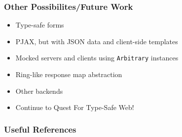 \begin{frame}
  \frametitle{Other Possibilites/Future Work}
  \begin{itemize}
    \pause
    \item<+-> Type-safe forms
    \item<+-> PJAX, but with JSON data and client-side templates
    \item<+-> Mocked servers and clients using \lstinline{Arbitrary} instances
    \item<+-> Ring-like response map abstraction
    \item<+-> Other backends
    \item<+-> Continue to Quest For Type-Safe Web!
  \end{itemize}
\end{frame}

\begin{frame}
\end{frame}

\begin{frame}[allowframebreaks]
	\frametitle{Useful References}
  \nocite{*}
	\printbibliography
\end{frame}

\begin{frame}
\end{frame}

\begin{frame}
  \titlepage
\end{frame}
